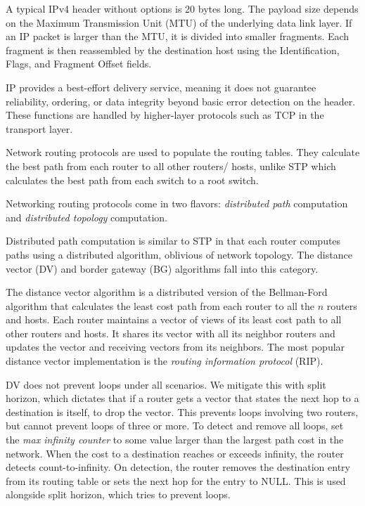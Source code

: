 A typical IPv4 header without options is 20 bytes long.
The payload size depends on the Maximum Transmission Unit
(MTU) of the underlying data link layer. If an IP packet
is larger than the MTU, it is divided into smaller fragments.
Each fragment is then reassembled by the destination host
using the Identification, Flags, and Fragment Offset fields.

IP provides a best-effort delivery service, meaning it does
not guarantee reliability, ordering, or data integrity beyond
basic error detection on the header. These functions are
handled by higher-layer protocols such as TCP in the transport layer.

Network routing protocols are used to populate the routing tables.
They calculate the best path from each router to all other routers/
hosts, unlike STP which calculates the best path from each switch
to a root switch.

Networking routing protocols come in two flavors: \emph{distributed path}
computation and \emph{distributed topology} computation.

Distributed path computation is similar to STP in that each router computes paths
using a distributed algorithm, oblivious of network topology. The distance vector (DV)
and border gateway (BG) algorithms fall into this category.

The distance vector algorithm is a distributed version of the Bellman-Ford algorithm that
calculates the least cost path from each router to all the $n$ routers and hosts.
Each router maintains a vector of views of its least cost path to all other routers and
hosts. It shares its vector with all its neighbor routers and updates the vector and
receiving vectors from its neighbors.
The most popular distance vector implementation is the \emph{routing information protocol}
(RIP).

DV does not prevent loops under all scenarios. We mitigate this with
split horizon, which dictates that if a router gets a vector that states
the next hop to a destination is itself, to drop the vector. This prevents
loops involving two routers, but cannot prevent loops of three or more.
To detect and remove all loops, set the \emph{max infinity counter} to
some value larger than the largest path cost in the network. When the cost
to a destination reaches or exceeds infinity, the router detects count-to-infinity.
On detection, the router removes the destination entry from its routing
table or sets the next hop for the entry to NULL. This is used alongside
split horizon, which tries to prevent loops.

